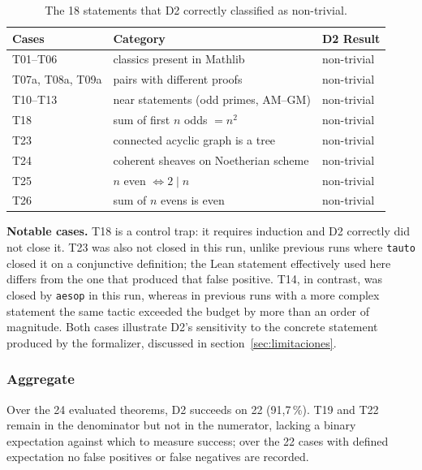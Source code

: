 \begin{table}[htbp]
\centering
\small
\setlength{\tabcolsep}{5pt}
\begin{tabular}{p{4.6cm}p{6.4cm}l}
\toprule
Cases & Category & D2 Result \\
\midrule
T01--T06                & classics present in Mathlib            & non-trivial \\
T07a, T08a, T09a        & pairs with different proofs          & non-trivial \\
T10--T13                & near statements (odd primes, AM--GM) & non-trivial \\
T18                     & sum of first $n$ odds $= n^2$ & non-trivial \\
T23                     & connected acyclic graph is a tree         & non-trivial \\
T24                     & coherent sheaves on Noetherian scheme & non-trivial \\
T25                     & $n$ even $\iff 2 \mid n$                  & non-trivial \\
T26                     & sum of $n$ evens is even                 & non-trivial \\
\bottomrule
\end{tabular}
\caption{The 18 statements that D2 correctly classified as non-trivial.}
\label{tab:d2notrivial}
\end{table}

\textbf{Notable cases.} T18 is a control trap: it requires induction and D2 correctly did not close it. T23 was also not closed in this run, unlike previous runs where \texttt{tauto} closed it on a conjunctive definition; the Lean statement effectively used here differs from the one that produced that false positive. T14, in contrast, was closed by \texttt{aesop} in this run, whereas in previous runs with a more complex statement the same tactic exceeded the budget by more than an order of magnitude. Both cases illustrate D2's sensitivity to the concrete statement produced by the formalizer, discussed in section~\ref{sec:limitaciones}.

\subsubsection*{Aggregate}

Over the 24 evaluated theorems, D2 succeeds on 22 (91{,}7\,\%). T19 and T22 remain in the denominator but not in the numerator, lacking a binary expectation against which to measure success; over the 22 cases with defined expectation no false positives or false negatives are recorded.

